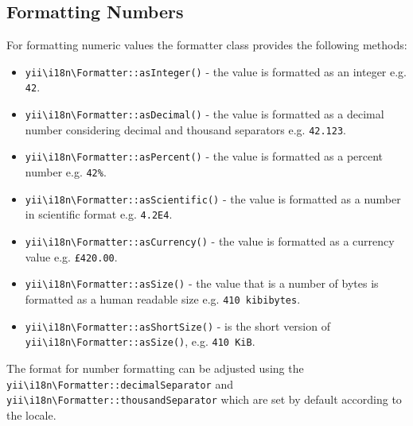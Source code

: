 \subsection{Formatting Numbers \label{output-formatter.md::numbers}}
For formatting numeric values the formatter class provides the following methods:

\begin{itemize}
\item \texttt{yii{\allowbreak{}\textbackslash}i18n{\allowbreak{}\textbackslash}Formatter\allowbreak{}::\allowbreak{}asInteger()} - the value is formatted as an integer e.g. \lstinline|42|.
\item \texttt{yii{\allowbreak{}\textbackslash}i18n{\allowbreak{}\textbackslash}Formatter\allowbreak{}::\allowbreak{}asDecimal()} - the value is formatted as a decimal number considering decimal and thousand separators e.g. \lstinline|42.123|.
\item \texttt{yii{\allowbreak{}\textbackslash}i18n{\allowbreak{}\textbackslash}Formatter\allowbreak{}::\allowbreak{}asPercent()} - the value is formatted as a percent number e.g. \lstinline|42%|.
\item \texttt{yii{\allowbreak{}\textbackslash}i18n{\allowbreak{}\textbackslash}Formatter\allowbreak{}::\allowbreak{}asScientific()} - the value is formatted as a number in scientific format e.g. \lstinline|4.2E4|.
\item \texttt{yii{\allowbreak{}\textbackslash}i18n{\allowbreak{}\textbackslash}Formatter\allowbreak{}::\allowbreak{}asCurrency()} - the value is formatted as a currency value e.g. \lstinline|£420.00|.
\item \texttt{yii{\allowbreak{}\textbackslash}i18n{\allowbreak{}\textbackslash}Formatter\allowbreak{}::\allowbreak{}asSize()} - the value that is a number of bytes is formatted as a human readable size e.g. \lstinline|410 kibibytes|.
\item \texttt{yii{\allowbreak{}\textbackslash}i18n{\allowbreak{}\textbackslash}Formatter\allowbreak{}::\allowbreak{}asShortSize()} - is the short version of \texttt{yii{\allowbreak{}\textbackslash}i18n{\allowbreak{}\textbackslash}Formatter\allowbreak{}::\allowbreak{}asSize()}, e.g. \lstinline|410 KiB|.
\end{itemize}
The format for number formatting can be adjusted using the \texttt{yii{\allowbreak{}\textbackslash}i18n{\allowbreak{}\textbackslash}Formatter\allowbreak{}::\allowbreak{}decimalSeparator} and
\texttt{yii{\allowbreak{}\textbackslash}i18n{\allowbreak{}\textbackslash}Formatter\allowbreak{}::\allowbreak{}thousandSeparator} which are set by default according to the locale.

